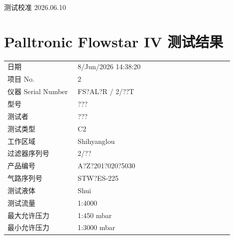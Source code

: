 \documentclass[UTF8,10pt,a4paper,fontset=fandol]{ctexart}
\newcommand{\fieldvalue}[1]{#1}
\newcommand{\handwritten}[1]{#1}
\begin{document}
\handwritten{测试校准 2026.06.10}

\newpage

\section{Palltronic Flowstar IV 测试结果}

\begin{tabular}{@{}p{0.28\linewidth}p{0.62\linewidth}@{}}
日期 &
\fieldvalue{8/Jun/2026 14:38:20} \\

项目 No. &
\fieldvalue{2} \\

仪器 Serial Number &
\fieldvalue{FS?AL?R / 2/??T} \\

型号 &
\fieldvalue{???} \\

测试者 &
\fieldvalue{???} \\

测试类型 &
\fieldvalue{C2} \\

工作区域 &
\fieldvalue{Shihyanglou} \\

过滤器序列号 &
\fieldvalue{2/??} \\

产品编号 &
\fieldvalue{A?Z?201?020?5030} \\

气路序列号 &
\fieldvalue{STW?ES-225} \\

测试液体 &
\fieldvalue{Shui} \\

测试流量 &
\fieldvalue{1:4000} \\

最大允许压力 &
\fieldvalue{1:450 mbar} \\

最小允许压力 &
\fieldvalue{1:3000 mbar}
\end{tabular}
\end{document}

